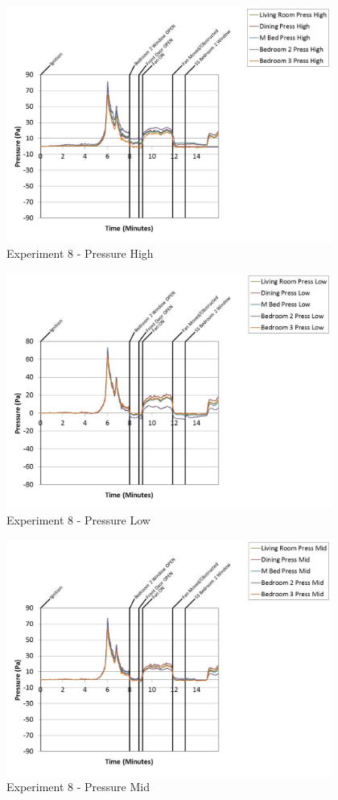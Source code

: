 \documentclass{article}
\begin{document}
\begin{appendices}
	\clearpage

	\begin{figure}[h!]
		\centering
		\includegraphics[height=3.05in]{0_Images/Results_Charts/Exp_8_Charts/PressureHigh.pdf}
		\caption{Experiment 8 - Pressure High}
	\end{figure}
 

	\begin{figure}[h!]
		\centering
		\includegraphics[height=3.05in]{0_Images/Results_Charts/Exp_8_Charts/PressureLow.pdf}
		\caption{Experiment 8 - Pressure Low}
	\end{figure}
 
	\clearpage

	\begin{figure}[h!]
		\centering
		\includegraphics[height=3.05in]{0_Images/Results_Charts/Exp_8_Charts/PressureMid.pdf}
		\caption{Experiment 8 - Pressure Mid}
	\end{figure}
 


\end{appendices}
\end{document}
